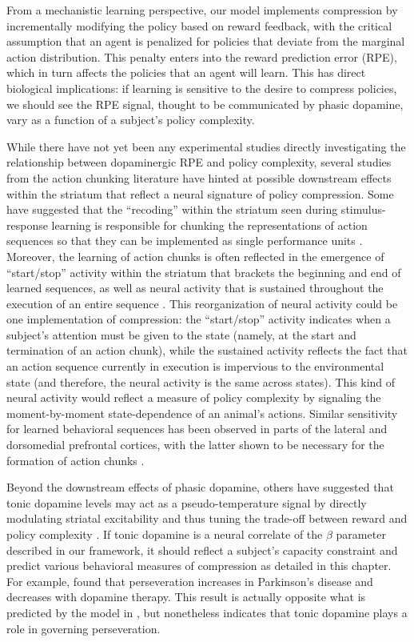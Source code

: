 \documentclass[11pt]{article}
\begin{document}
From a mechanistic learning perspective, our model implements compression by incrementally modifying the policy based on reward feedback, with the critical assumption that an agent is penalized for policies that deviate from the marginal action distribution. This penalty enters into the reward prediction error (RPE), which in turn affects the policies that an agent will learn. This has direct biological implications: if learning is sensitive to the desire to compress policies, we should see the RPE signal, thought to be communicated by phasic dopamine, vary as a function of a subject's policy complexity. 

While there have not yet been any experimental studies directly investigating the relationship between dopaminergic RPE and policy complexity, several studies from the action chunking literature have hinted at possible downstream effects within the striatum that reflect a neural signature of policy compression. Some have suggested that the ``recoding'' within the striatum seen during stimulus-response learning is responsible for chunking the representations of action sequences so that they can be implemented as single performance units \citep{graybiel98}. Moreover, the learning of action chunks is often reflected in the emergence of ``start/stop'' activity within the striatum that brackets the beginning and end of learned sequences, as well as neural activity that is sustained throughout the execution of an entire sequence \citep{Graybiel1998-sw,Smith2013-ji,jin10,jin14}. This reorganization of neural activity could be one implementation of compression: the ``start/stop'' activity indicates when a subject's attention must be given to the state (namely, at the start and termination of an action chunk), while the sustained activity reflects the fact that an action sequence currently in execution is impervious to the environmental state (and therefore, the neural activity is the same across states). This kind of neural activity would reflect a measure of policy complexity by signaling the moment-by-moment state-dependence of an animal's actions. Similar sensitivity for learned behavioral sequences has been observed in parts of the lateral and dorsomedial prefrontal cortices, with the latter shown to be necessary for the formation of action chunks \citep{Shima2007-ps,ostlund09}. 

Beyond the downstream effects of phasic dopamine, others have suggested that tonic dopamine levels may act as a pseudo-temperature signal by directly modulating striatal excitability and thus tuning the trade-off between reward and policy complexity \citep{parush11}. If tonic dopamine is a neural correlate of the $\beta$ parameter described in our framework, it should reflect a subject's capacity constraint and predict various  behavioral measures of compression as detailed in this chapter. For example, \citet{rutledge09} found that perseveration increases in Parkinson's disease and decreases with dopamine therapy. This result is actually opposite what is predicted by the model in \citet{parush11}, but nonetheless indicates that tonic dopamine plays a role in governing perseveration.
\end{document}
